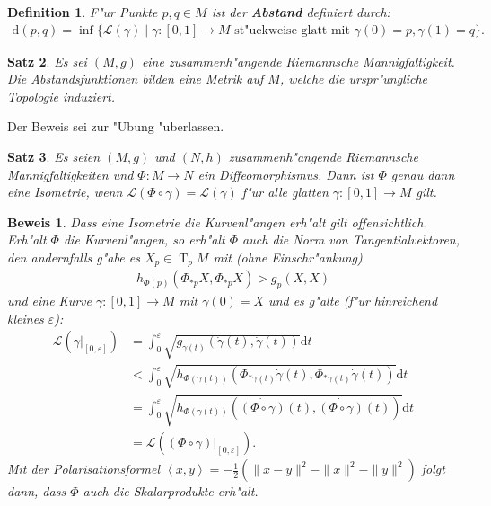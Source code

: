 \documentclass[paper=A4, twoside, chapterprefix=true, bibliography=totoc, headsepline]{scrbook}
\let\temp\phi
\let\phi\varphi
\let\varphi\temp
\let\temp\theta
\let\theta\vartheta
\let\vartheta\temp
\let\temp\epsilon
\let\epsilon\varepsilon
\let\varepsilon\temp
\let\temp\rho
\let\rho\varrho
\let\varrho\temp
\DeclareMathOperator{\T}{T} %
\newcommand{\dop}{\mathrm{d}}
\theoremstyle{plain}
\newtheorem{Dfn}{Definition}[chapter]
\newtheorem{Satz}[Dfn]{Satz}
\theoremstyle{nonumberplain}
\newtheorem{bew}{Beweis}
\theoremstyle{empty}
\theoremstyle{break}
\newcommand{\CmIndex}[2][]{\ifthenelse{\isempty{#1}}{\index{#2}}{\index{#1}}#2}
\newcommand{\CmMark}[2][]{\textbf{\CmIndex[#1]{#2}}}
\begin{document}
\begin{Dfn}
  F"ur Punkte $p, q \in M$ ist der \CmMark{Abstand} definiert durch:
  \begin{align*}
    \dop(p,q) = \inf\{ \mathcal L(\gamma) \mid \gamma \colon [0,1] \to M \text{ st"uckweise glatt mit } \gamma(0) = p, \gamma(1) = q\}.
  \end{align*}
\end{Dfn}

\begin{Satz}
  Es sei $(M,g)$ eine zusammenh"angende Riemannsche Mannigfaltigkeit.
  Die Abstandsfunktionen bilden eine Metrik auf $M$, welche die urspr"ungliche Topologie induziert.
\end{Satz}

Der Beweis sei zur "Ubung "uberlassen.

\begin{Satz}
  Es seien $(M,g)$ und $(N,h)$ zusammenh"angende Riemannsche Mannigfaltigkeiten und $\Phi \colon M \to N$ ein Diffeomorphismus.
  Dann ist $\Phi$ genau dann eine Isometrie, wenn $\mathcal L(\Phi \circ \gamma) = \mathcal L(\gamma)$ f"ur alle glatten $\gamma \colon [0,1] \to M$ gilt. 
\end{Satz}

\begin{bew}
  Dass eine Isometrie die Kurvenl"angen erh"alt gilt offensichtlich. Erh"alt $\Phi$ die Kurvenl"angen, so erh"alt $\Phi$ auch die Norm von Tangentialvektoren, den andernfalls g"abe es $X_p \in \T_pM$ mit (ohne Einschr"ankung)
  \begin{align*}
    h_{\Phi(p)}(\Phi_{*p}X,\Phi_{*p}X) > g_p(X,X)
  \end{align*}
  und eine Kurve $\gamma\colon [0,1] \to M$ mit $\gamma(0) = X$ und es g"alte (f"ur hinreichend kleines $\epsilon$):
  \begin{align*}
    \mathcal L(\gamma|_{[0,\epsilon]}) & = \int_0^{\epsilon}\sqrt{g_{\gamma(t)}\left(\dot\gamma(t),\dot\gamma(t)\right)}\dop t\\
    & < \int_0^{\epsilon}\sqrt{h_{\Phi(\gamma(t))} \left(\Phi_{*\gamma(t)}\dot\gamma(t), \Phi_{*\gamma(t)}\dot\gamma(t)\right)}\dop t\\
    & = \int_0^{\epsilon}\sqrt{h_{\Phi(\gamma(t))} \left(\dot{(\Phi \circ \gamma)}(t), \dot{(\Phi \circ \gamma)}(t) \right)}\dop t\\
    & = \mathcal L \left((\Phi \circ \gamma)|_{[0,\epsilon]}\right).
  \end{align*}
  Mit der Polarisationsformel $\left<x,y\right> = - \frac{1}2 (\|x-y\|^{2} - \|x\|^2-\|y\|^2)$ folgt dann, dass $\Phi$ auch die Skalarprodukte erh"alt.
\end{bew}
\end{document}
